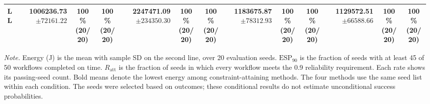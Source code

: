 \documentclass[10pt]{article}
\begin{document}
\begin{table}[!htbp]
\begin{tabular}{@{}l*{4}{rcc}@{}}
LL & \shortstack[r]{\textbf{1006236.73}\\$\pm 72161.22$} & \shortstack[c]{100\%\\(20/20)} & \shortstack[c]{100\%\\(20/20)} & \shortstack[r]{2247471.09\\$\pm 234350.30$} & \shortstack[c]{100\%\\(20/20)} & \shortstack[c]{100\%\\(20/20)} & \shortstack[r]{1183675.87\\$\pm 78312.93$} & \shortstack[c]{100\%\\(20/20)} & \shortstack[c]{100\%\\(20/20)} & \shortstack[r]{1129572.51\\$\pm 66588.66$} & \shortstack[c]{100\%\\(20/20)} & \shortstack[c]{100\%\\(20/20)} \\
\bottomrule
\end{tabular}
\par\vspace{3pt}
\parbox{\textwidth}{\footnotesize
\textit{Note.} Energy (J) is the mean with sample SD on the second line, over 20 evaluation seeds.
$\mathrm{ESP}_{90}$ is the fraction of seeds with at least 45 of 50 workflows completed on time.
$R_{\mathrm{att}}$ is the fraction of seeds in which every workflow meets the 0.9 reliability requirement.
Each rate shows its passing-seed count. Bold means denote the lowest energy among constraint-attaining methods.
The four methods use the same seed list within each condition.
The seeds were selected based on outcomes; these conditional results do not estimate unconditional success probabilities.}
\endgroup
\end{table}
\clearpage
\end{document}
